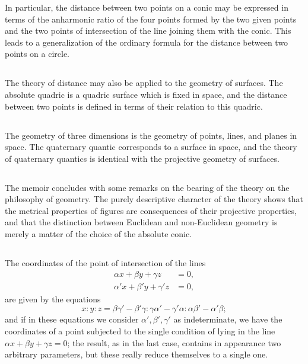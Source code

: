 \documentclass[12pt,a4paper]{article}
\begin{document}
In particular, the distance between two points on a conic may be expressed in terms of the anharmonic ratio of the four points formed by the two given points and the two points of intersection of the line joining them with the conic. This leads to a generalization of the ordinary formula for the distance between two points on a circle.

\subsection{}

The theory of distance may also be applied to the geometry of surfaces. The absolute quadric is a quadric surface which is fixed in space, and the distance between two points is defined in terms of their relation to this quadric.

\subsection{}

The geometry of three dimensions is the geometry of points, lines, and planes in space. The quaternary quantic corresponds to a surface in space, and the theory of quaternary quantics is identical with the projective geometry of surfaces.

\subsection{}

The memoir concludes with some remarks on the bearing of the theory on the philosophy of geometry. The purely descriptive character of the theory shows that the metrical properties of figures are consequences of their projective properties, and that the distinction between Euclidean and non-Euclidean geometry is merely a matter of the choice of the absolute conic.

\subsection{}

The coordinates of the point of intersection of the lines
\begin{align*}
\alpha x + \beta y + \gamma z &= 0,\\
\alpha' x + \beta' y + \gamma' z &= 0,
\end{align*}
are given by the equations
\[
x : y : z = \beta\gamma' - \beta'\gamma : \gamma\alpha' - \gamma'\alpha : \alpha\beta' - \alpha'\beta;
\]
and if in these equations we consider $\alpha', \beta', \gamma'$ as indeterminate, we have the coordinates of a point subjected to the single condition of lying in the line $\alpha x + \beta y + \gamma z = 0$; the result, as in the last case, contains in appearance two arbitrary parameters, but these really reduce themselves to a single one.
\end{document}
